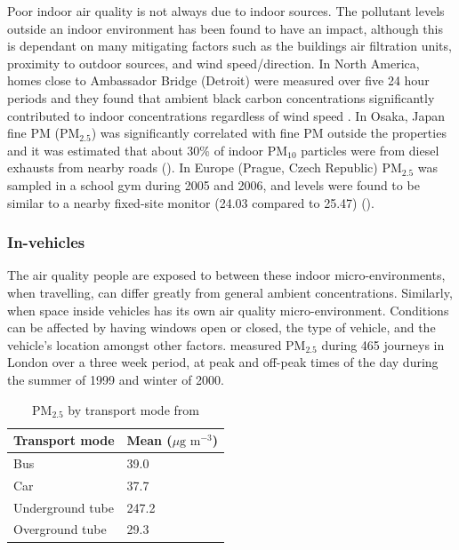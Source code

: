 Poor indoor air quality is not always due to indoor sources. The pollutant levels outside an indoor environment has been found to have an impact, although this is dependant on many mitigating factors such as the buildings air filtration units, proximity to outdoor sources, and wind speed/direction. In North America, homes close to Ambassador Bridge (Detroit) were measured over five 24 hour periods and they found that ambient black carbon concentrations significantly contributed to indoor concentrations regardless of wind speed \cite{Baxter2008}. In Osaka, Japan fine PM (PM$_{2.5}$) was significantly correlated with fine PM outside the properties and it was estimated that about 30\% of indoor PM$_{10}$ particles were from diesel exhausts from nearby roads (\cite{Funasaka2000}). In Europe (Prague, Czech Republic) PM$_{2.5}$ was sampled in a school gym during 2005 and 2006, and levels were found to be similar to a nearby fixed-site monitor (24.03 compared to 25.47) (\cite{Branis2009}).

\subsubsection{In-vehicles}
\label{subsubsec:invehicle}

The air quality people are exposed to between these indoor micro-environments, when travelling, can differ greatly from general ambient concentrations. Similarly, when space inside vehicles has its own air quality micro-environment. Conditions can be affected by having windows open or closed, the type of vehicle, and the vehicle's location amongst other factors. \cite{Adams2001} measured PM$_{2.5}$ during 465 journeys in London over a three week period, at peak and off-peak times of the day during the summer of 1999 and winter of 2000.

\begin{table}[H]
\centering
    \begin{tabular}{ | l | l |}
    \hline 
     \bfseries{Transport mode} & \bfseries{Mean ($\mu \text{g m}^{-3}$)} \\ \hline
     Bus & 39.0\\ \hline
     Car & 37.7\\ \hline
     Underground tube & 247.2\\ \hline
     Overground tube & 29.3\\ \hline
    \end{tabular}
\caption{PM$_{2.5}$ by transport mode from \cite{Adams2001}}
\label{tab:adams_transport_means}
\end{table}

